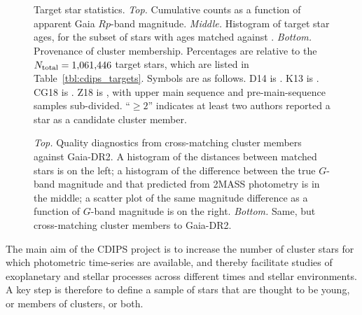 \documentclass[12pt,twocolumn,tighten]{aastex62}
\begin{document}
\begin{figure}[!t]
	\begin{center}
		\leavevmode
		\vspace{-0.8cm}
		\vspace{-0.8cm}
	\end{center}
	\vspace{-0.8cm}
	\caption{
		Target star statistics.
		{\it Top.} Cumulative counts as a function of apparent Gaia $Rp$-band
		magnitude.  
		{\it Middle.} Histogram of target star ages, for the subset of
		stars with ages matched against \citet{Kharchenko_et_al_2013}.
		{\it Bottom.} Provenance of cluster membership.  Percentages are
		relative to the $N_{\rm total}=1{,}061{,}446$ target stars, which are listed in
		Table~\ref{tbl:cdips_targets}. Symbols
		are as follows.
		D14 is \citet{dias_proper_2014}.
		K13 is \citet{Kharchenko_et_al_2013}.
		CG18 is \citet{cantat-gaudin_gaia_2018}.
		Z18 is \citet{zari_3d_2018}, with upper main sequence and
		pre-main-sequence samples sub-divided.
		``$\geq 2$'' indicates at least two authors reported a star as a
		candidate cluster member.
		\label{fig:cdips_targets}
	}
\end{figure}

\begin{figure}[!t]
	\vspace{-1.1cm}
	\vspace{-0.8cm}
	\caption{
    {\it Top.} Quality diagnostics from cross-matching
    \cite{Kharchenko_et_al_2013} cluster members against Gaia-DR2.  A
    histogram of the distances between matched stars is on the left; a
    histogram of the difference between the true $G$-band magnitude
    and that predicted from 2MASS photometry is in the middle; a
    scatter plot of the same magnitude difference as a function of
    $G$-band magnitude is on the right.
		{\it Bottom.} Same, but cross-matching \cite{dias_proper_2014}
		cluster members to Gaia-DR2.
	}
	\label{fig:xmatch_info}
\end{figure}

The main aim of the CDIPS project is to increase the number of cluster
stars for which photometric time-series are available, and thereby
facilitate studies of exoplanetary and stellar processes across
different times and stellar environments.  A key step is therefore to
define a sample of stars that are thought to be young, or members of
clusters, or both.
\end{document}
